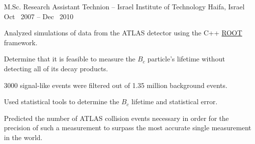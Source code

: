 \begin{cventries}
    \cventryWithTags
    {M.Sc. Research Assistant} %
    {Technion -- Israel Institute of Technology} %
    {Haifa, Israel} %
    {Oct \ 2007 -- Dec \ 2010} %
    {    \fbox{\LaTeX}} %
    {
      \begin{cvitems} %
        \item {Analyzed simulations of data from the ATLAS detector using the C++ \hypersetup{urlcolor=blue}\href{https://root.cern.ch/}{ROOT} framework.}
        \item {Determine that it is feasible to measure the $B_c$ particle's lifetime without detecting all of its decay products.}
        \item {3000 signal-like events were filtered out of 1.35 million background events.}
        \item {Used statistical tools to determine the $B_c$ lifetime and statistical error.}
        \item {Predicted the number of ATLAS collision events necessary in order for the precision of such a measurement to surpass the most accurate single measurement in the world.}
      \end{cvitems}
    }
  \end{cventries}
